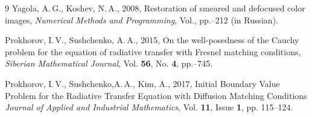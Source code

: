 \documentclass{procDDs}
\begin{document}
\begin {thebibliography}{9}
 Yagola, A.\,G., Koshev, N.\,A., 2008,
Restoration of smeared and defocused color images, 
\emph{Numerical Methods and Programming},
Vol., pp.--212 (in Russian).

 Prokhorov, I.\,V., Sushchenko,  A.\,A., 2015, 
On the well-posedness of the Cauchy problem for the equation of radiative transfer with Fresnel matching conditions,
\emph{Siberian Mathematical Journal},
Vol.\; {\bf 56}, No. {\bf 4}, pp.--745.

 Prokhorov, I.\,V., Sushchenko,A.\,A., Kim, A., 2017, Initial Boundary Value Problem for the
Radiative Transfer Equation with Diffusion Matching Conditions
\emph{ Journal of Applied and Industrial Mathematics},  Vol. {\bf
	11}, Issue {\bf 1}, pp. 115--124.

\end{thebibliography}
\end{document}
